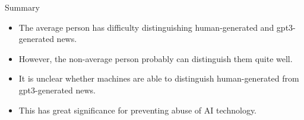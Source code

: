 \begin{vbframe}{Summary}

\vfill

  \begin{itemize}
\item The average person has difficulty distinguishing
human-generated and gpt3-generated news.
\item However, the non-average person probably can
distinguish them quite well.
\item It is unclear whether  machines
are able to distinguish
human-generated from gpt3-generated news.
\item This has great significance for preventing abuse
of AI technology.
  \end{itemize}

\vfill

\end{vbframe}


\endlecture

